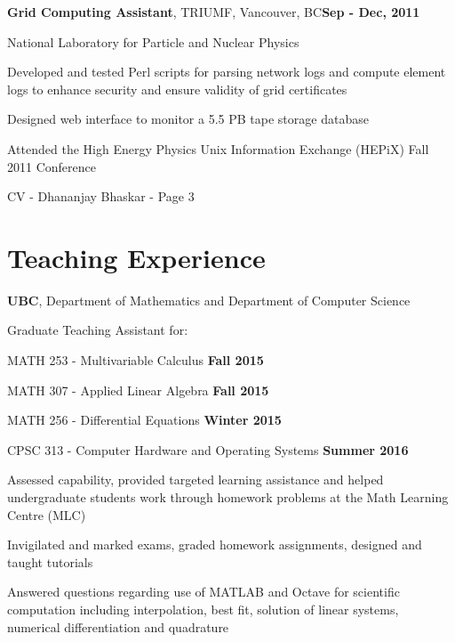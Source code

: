 \documentclass[margin,line]{res}
\newenvironment{list1}{
  \begin{list}{\ding{113}}{
      \setlength{\itemsep}{0in}
      \setlength{\parsep}{0in} \setlength{\parskip}{0in}
      \setlength{\topsep}{0in} \setlength{\partopsep}{0in} 
      \setlength{\leftmargin}{0.17in}}}{\end{list}}
\newenvironment{list3}{
  \begin{list}{\textopenbullet}{
      \setlength{\itemsep}{0in}
      \setlength{\parsep}{0in} \setlength{\parskip}{0in}
      \setlength{\topsep}{0in} \setlength{\partopsep}{0in} 
      \setlength{\leftmargin}{0.1in}}}{\end{list}}
\begin{document}
\begin{resume}
{\bf Grid Computing Assistant}, TRIUMF, Vancouver, BC\hfill{\bf Sep - Dec, 2011}\\
\vspace*{-.2cm}
\begin{list1}
\item[] National Laboratory for Particle and Nuclear Physics
\vspace*{.1cm}
\begin{list3}
\item Developed and tested Perl scripts for parsing network logs and compute element logs to enhance security and ensure validity of grid certificates
\item Designed web interface to monitor a 5.5 PB tape storage database
\item Attended the High Energy Physics Unix Information Exchange (HEPiX) Fall 2011 Conference
\end{list3}
\end{list1}

\newpage
\begin{flushright}
CV - Dhananjay Bhaskar - Page 3
\end{flushright}
\vspace*{.1cm}

\section{\sc Teaching Experience}

{\bf  UBC}, Department of Mathematics and Department of Computer Science\\
\vspace*{-.2cm}
\begin{list1}
\item[] Graduate Teaching Assistant for:\\[-0.1cm]
\item[] MATH 253 - Multivariable Calculus \hfill {\bf Fall 2015}
\item[] MATH 307 - Applied Linear Algebra \hfill {\bf Fall 2015}
\item[] MATH 256 - Differential Equations \hfill {\bf Winter 2015}
\item[] CPSC 313 - Computer Hardware and Operating Systems \hfill {\bf Summer 2016}\\
\begin{list3}
\vspace*{-.1cm}
\item Assessed capability, provided targeted learning assistance and helped undergraduate students work through homework problems at the Math Learning Centre (MLC)
\item Invigilated and marked exams, graded homework assignments, designed and taught tutorials
\item Answered questions regarding use of MATLAB and Octave for scientific computation including interpolation, best fit, solution of linear systems, numerical differentiation and quadrature
\end{list3}
\end{list1}
\vspace*{.1cm}


\end{resume}
\end{document}
